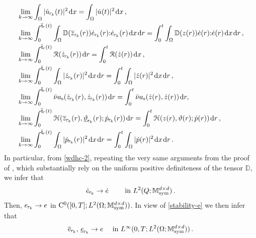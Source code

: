 \documentclass[a4paper,10pt,reqno]{amsart}
\numberwithin{equation}{section}
\newcommand{\bbM}{\mathbb{M}}
\numberwithin{equation}{section}
\def\dd{\;\!\mathrm{d}} %
\newcommand{\teta}{\vartheta}
\newcommand{\piecewiseConstant}[2]{\overline{#1}_{\kern-1pt#2}}
\newcommand{\pwc}{\piecewiseConstant}
\newcommand{\upiecewiseConstant}[2]{\underline{#1}_{\kern-1pt#2}}
\newcommand{\upwc}{\upiecewiseConstant}
\newcommand{\piecewiseLinear}[2]{{#1}_{\kern-1pt#2}}
\newcommand{\pwl}{\piecewiseLinear}
\newcommand{\bbD}{\mathbb{D}}
\newcommand{\mt}{\bbM}
\newcommand{\sym}{\mathrm{sym}}
\newcommand{\Dip}[3]{\mathcal{H}(#1,#2;#3)}
\newcommand{\Did}[1]{\mathcal{R}(#1)}
\newcommand{\ass}{a_{\mathrm{s}}}
\newcommand{\EEE}{\color{black}}
\begin{document}
\begin{subequations}
\label{we-do-have-convergences}
\begin{align}
&
\label{wdhc-1}
\lim_{k\to\infty}\int_\Omega |\pwl{\dot{u}}{\tau_k}(t)|^2 \dd x = \int_\Omega |\dot{u}(t)|^2 \dd x\,,
\\
&
\label{wdhc-2}
 \lim_{k\to\infty} \int_{0}^{\pwc{\mathsf{t}}{\tau}(t)} \int_\Omega
 \bbD(\pwc z{\tau_k}(r)) \pwl{\dot e}{\tau_k}(r) {:} \pwl{\dot e}{\tau_k}(r)  \dd x \dd r =
 \int_0^t \int_\Omega \bbD(z(r)) \dot{e}(r) {:} \dot{e}(r) \dd x \dd r\,,
 \\
 &
\label{wdhc-3}
 \lim_{k\to\infty} \int_{0}^{\pwc{\mathsf{t}}{\tau}(t)}  \Did{\pwl{\dot{z}}{\tau_k}(r)} \dd r =
  \int_0^t \Did{\dot{z}(r)} \dd x\,,
  \\
 &
\label{wdhc-4}
 \lim_{k\to\infty} \int_{0}^{\pwc{\mathsf{t}}{\tau}(t)} \int_\Omega  |\pwl{\dot{z}}{\tau_k}(r)|^2  \dd x \dd r =
 \int_0^t \int_\Omega |\dot{z}(r)|^2 \dd x \dd r\,,
\\
 &
\label{wdhc-5}
 \lim_{k\to\infty} \int_{0}^{\pwc{\mathsf{t}}{\tau}(t)}  \bar{\nu} \ass (\pwl{\dot{z}}{\tau_k}(r), 
 \pwl{\dot{z}}{\tau_k}(r)) \dd r = \int_0^t \bar{\nu} \ass(\dot{z}(r), \dot{z}(r)) \dd r,
 \\
 &
 \label{wdhc-6}
 \lim_{k\to\infty} \int_{0}^{\pwc{\mathsf{t}}{\tau}(t)}  \Dip{\pwc z{\tau_k}(r)}{\upwc\teta{\tau_k}(r)}{  
 \pwl {\dot p}{\tau_k}(r)} \dd r=  
\int_0^t \Dip{z(r)}{\teta(r)}{  \dot{p}(r)} \dd r\,,
\\
 &
\label{wdhc-7}
 \lim_{k\to\infty} \int_{0}^{\pwc{\mathsf{t}}{\tau}(t)} \int_\Omega  |\pwl{\dot{p}}{\tau_k}(r)|^2  \dd x \dd r =
 \int_0^t \int_\Omega |\dot{p}(r)|^2 \dd x \dd r\,.
 \end{align}
\end{subequations}
In particular,  from \eqref{wdhc-2}, repeating the very same arguments from the proof  of \cite[Thm.\ 5.3]{LRTT}, which substantially rely on the 
uniform positive definiteness of the tensor $\bbD$, we infer that 
\begin{equation}
\label{strong-cv-dote}
\pwl{\dot e}{\tau_k} \to \dot{e} \qquad \text{ in } L^2(Q; \mt_\sym^{d\times d})\,.
\end{equation}
Then, $\pwl e{\tau_k} \to e $ in $\rmC^0([0,T]; L^2(\Omega; \mt_\sym^{d\times d}))$. 
In view of \eqref{stability-e} we then infer that 
\begin{equation}
\label{strong-conv-e-needed}
\pwc e{\tau_k}, \,  \upwc e{\tau_k} \to e \quad \text{ in } L^\infty (0,T;L^2(\Omega; \mt_\sym^{d\times d}))\,.
\end{equation}
\end{document}
